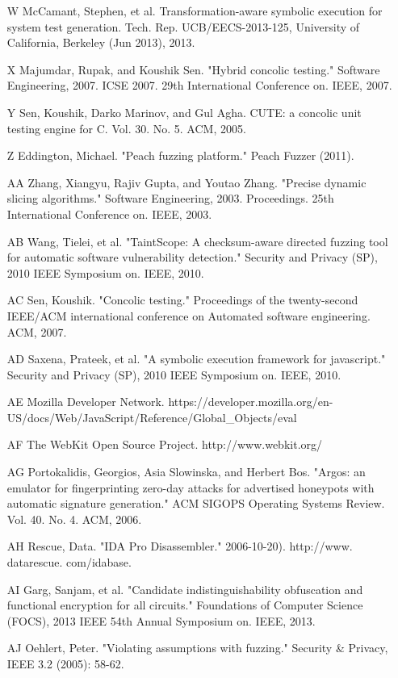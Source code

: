 \documentclass[11pt,expanded,copyright]{fsuthesis}
\begin{document}
\begin{itemize}
	\item [W] McCamant, Stephen, et al. Transformation-aware symbolic execution for system test generation. Tech. Rep. UCB/EECS-2013-125, University of California, Berkeley (Jun 2013), 2013.
	\item [X] Majumdar, Rupak, and Koushik Sen. "Hybrid concolic testing." Software Engineering, 2007. ICSE 2007. 29th International Conference on. IEEE, 2007.
	\item [Y] Sen, Koushik, Darko Marinov, and Gul Agha. CUTE: a concolic unit testing engine for C. Vol. 30. No. 5. ACM, 2005.
	\item [Z] Eddington, Michael. "Peach fuzzing platform." Peach Fuzzer (2011).
	\item [AA] Zhang, Xiangyu, Rajiv Gupta, and Youtao Zhang. "Precise dynamic slicing algorithms." Software Engineering, 2003. Proceedings. 25th International Conference on. IEEE, 2003.
	\item [AB] Wang, Tielei, et al. "TaintScope: A checksum-aware directed fuzzing tool for automatic software vulnerability detection." Security and Privacy (SP), 2010 IEEE Symposium on. IEEE, 2010.
	\item [AC] Sen, Koushik. "Concolic testing." Proceedings of the twenty-second IEEE/ACM international conference on Automated software engineering. ACM, 2007.
	\item [AD] Saxena, Prateek, et al. "A symbolic execution framework for javascript." Security and Privacy (SP), 2010 IEEE Symposium on. IEEE, 2010.
	\item [AE] Mozilla Developer Network. https://developer.mozilla.org/en-US/docs/Web/JavaScript/Reference/Global\_Objects/eval
	\item [AF] The WebKit Open Source Project. http://www.webkit.org/
	\item [AG] Portokalidis, Georgios, Asia Slowinska, and Herbert Bos. "Argos: an emulator for fingerprinting zero-day attacks for advertised honeypots with automatic signature generation." ACM SIGOPS Operating Systems Review. Vol. 40. No. 4. ACM, 2006.
	\item [AH] Rescue, Data. "IDA Pro Disassembler." 2006-10-20). http://www. datarescue. com/idabase.
	\item [AI] Garg, Sanjam, et al. "Candidate indistinguishability obfuscation and functional encryption for all circuits." Foundations of Computer Science (FOCS), 2013 IEEE 54th Annual Symposium on. IEEE, 2013.
	\item [AJ] Oehlert, Peter. "Violating assumptions with fuzzing." Security \& Privacy, IEEE 3.2 (2005): 58-62.

\end{itemize}
\end{document}
